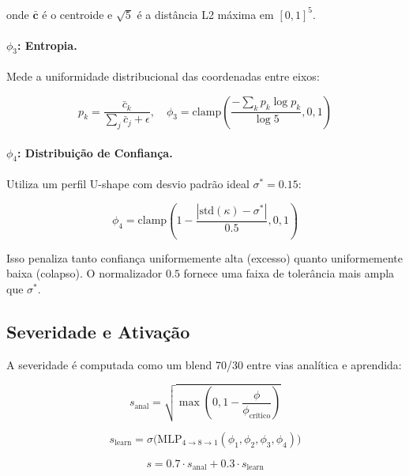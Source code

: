 onde $\bar{\bm{c}}$ \'e o centroide e $\sqrt{5}$ \'e a dist\^ancia L2
m\'axima em $[0,1]^5$.

\paragraph{$\phi_3$: Entropia.}
Mede a uniformidade distribucional das coordenadas entre eixos:

\begin{equation}
    p_k = \frac{\bar{c}_k}{\sum_j \bar{c}_j + \epsilon}, \quad
    \phi_3 = \text{clamp}\left(\frac{-\sum_k p_k \log p_k}{\log 5}, 0, 1\right)
\end{equation}

\paragraph{$\phi_4$: Distribui\c{c}\~ao de Confian\c{c}a.}
Utiliza um perfil U-shape com desvio padr\~ao ideal $\sigma^* = 0.15$:

\begin{equation}
    \phi_4 = \text{clamp}\left(1 - \frac{|\text{std}(\kappa) - \sigma^*|}{0.5}, 0, 1\right)
\end{equation}

Isso penaliza tanto confian\c{c}a uniformemente alta (excesso) quanto
uniformemente baixa (colapso). O normalizador $0.5$ fornece uma faixa
de toler\^ancia mais ampla que $\sigma^*$.

\subsection{Severidade e Ativa\c{c}\~ao}

A severidade \'e computada como um blend 70/30 entre vias anal\'itica
e aprendida:

\begin{equation}
    s_{\text{anal}} = \sqrt{\max\left(0, 1 - \frac{\phi}{\phi_{\text{cr\'itico}}}\right)}
    \label{eq:vi_severity_anal}
\end{equation}

\begin{equation}
    s_{\text{learn}} = \sigma\big(\text{MLP}_{4 \to 8 \to 1}(\phi_1, \phi_2, \phi_3, \phi_4)\big)
\end{equation}

\begin{equation}
    s = 0.7 \cdot s_{\text{anal}} + 0.3 \cdot s_{\text{learn}}
    \label{eq:vi_severity}
\end{equation}

